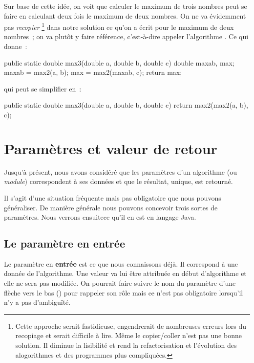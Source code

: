 	Sur base de cette idée, 
	on voit que calculer le maximum de trois nombres
	peut se faire en calculant deux fois le maximum de deux nombres.
	On ne va évidemment pas \emph{recopier}%
	\footnote{
		Cette approche serait fastidieuse,
		engendrerait de nombreuses erreurs lors du recopiage
		et serait difficile à lire. Même le copier/coller n'est pas une bonne 
		solution. Il diminue la lisibilité et rend la refactorisation et 
		l'évolution des alogorithmes et des programmes plus compliquées.
	} dans notre solution
	ce qu’on a écrit pour le maximum de deux nombres~;
	on va plutôt y faire référence, 
	c’est-à-dire appeler l’algorithme . 
	Ce qui donne~:

	\begin{java}
public static double max3(double a, double b, double c){
	double maxab, max;
	maxab = max2(a, b);
	max = max2(maxab, c);
	return max;
}
	\end{java}

	qui peut se simplifier en~:
	
	\begin{java}
public static double max3(double a, double b, double c){
	return max2(max2(a, b), c);
}
	\end{java}

\section{Paramètres et valeur de retour}
\label{paramètres}

	Jusqu’à présent, nous avons considéré que les paramètres d’un algorithme
	(ou \emph{module}) correspondent à ses données et que le
	résultat, unique, est retourné.

	Il s’agit d’une situation fréquente mais pas obligatoire que nous pouvons
	généraliser.  De manière générale nous pouvons concevoir trois sortes de
	paramètres. Nous verrons ensuitece qu'il en est en langage Java. 

	\subsection{Le paramètre en entrée}
	\label{param.entrée}

		Le paramètre en \textbf{entrée} est ce que nous connaissons déjà.  Il
		correspond à une donnée de l’algorithme.  Une valeur va lui être
		attribuée en début d’algorithme et elle ne sera pas modifiée.  On pourrait
		faire suivre le nom du paramètre d’une flèche vers le bas (\In) pour
		rappeler son rôle mais ce n'est pas obligatoire lorsqu'il n'y a pas
		d'ambiguïté.
		

